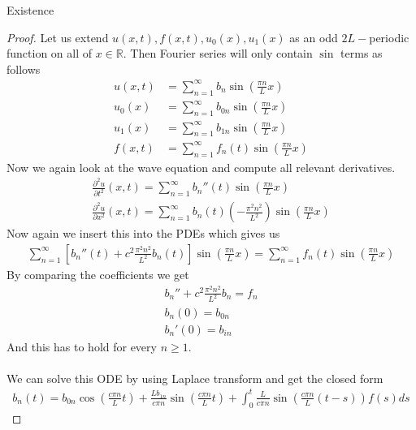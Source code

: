 \begin{parag}{Existence}
    \begin{proof}
        Let us extend $u\left(x, t\right), f\left(x, t\right), u_0\left(x\right), u_1\left(x\right)$ as an odd $2L-$periodic function on all of $ x \in \mathbb{R}$. Then Fourier series will only contain $\sin$ terms as follows 
		\begin{align*} 
			u\left(x, t\right) &= \sum_{n = 1}^{\infty}b_n \sin\left(\frac{\pi n}{L}x\right)\\
			u_0\left(x\right)&= \sum_{n = 1}^{\infty}b_{0n}\sin\left(\frac{\pi n}{L}x\right)\\
			u_1\left(x\right) &= \sum_{n = 1}^{\infty}b_{1n}\sin\left(\frac{\pi n}{L}x\right)\\
			f\left(x, t\right) &= \sum_{n = 1}^{\infty}f_n\left(t\right)\sin\left(\frac{\pi n}{L}x\right)
		\end{align*}
		Now we again look at the wave equation and compute all relevant derivatives. 
		\begin{align*} 
			\frac{\partial^2 u}{\partial t^2} \left(x, t\right) = \sum_{n = 1}^{\infty}b_n''\left(t\right)\sin\left(\frac{\pi n}{L}x\right)\\
			\frac{\partial^2 u}{\partial x^2} \left(x, t\right) =  \sum_{n = 1}^{\infty}b_n\left(t\right)\left(-\frac{\pi^2n^2}{L^2}\right) \sin\left(\frac{\pi n}{L}x\right)
		\end{align*}
		Now again we insert this into the PDEs which gives us 
		\begin{align*} 
			\sum_{n = 1}^{\infty}\left[b_n''\left(t\right) + c^2\frac{\pi^2n^2}{L^2}b_n\left(t\right)\right]\sin\left(\frac{\pi n}{L}x\right) = \sum_{n = 1}^{\infty}f_n\left(t\right)\sin\left(\frac{\pi n}{L}x\right)
		\end{align*}
		By comparing the coefficients we get 
		\begin{align*} 
			b_n'' + c^2\frac{\pi^2 n^2}{L^2}b_n = f_n\\
			b_n\left(0\right) = b_{0n}\\
			b_n'\left(0\right) = b_{in}
		\end{align*}
		And this has to hold for every $n \geq 1$.\\
		$ $\\
		We can solve this ODE by using Laplace transform and get the closed form 
		\begin{align*} 
			b_{n}\left(t\right) = b_{0n}\cos\left(\frac{c\pi n}{L}t\right) + \frac{Lb_{1n}}{c\pi n} \sin\left(\frac{c \pi n}{L}t\right) + \int_{0}^{t}\frac{L}{c\pi n}\sin\left(\frac{c \pi n}{L}\left(t - s\right)\right)f\left(s\right)ds 
		\end{align*}
    \end{proof}
\end{parag}


